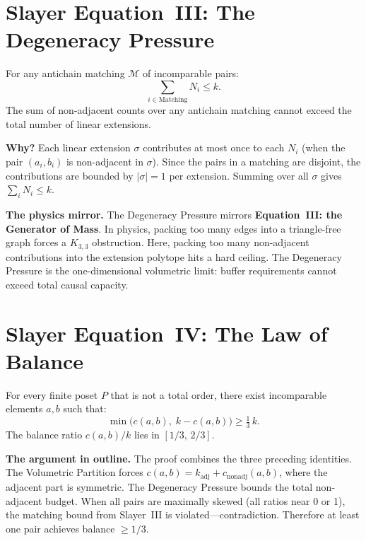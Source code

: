 \documentclass[11pt, a4paper, openany]{book}
\newcounter{thm}[chapter]
\begin{document}
\section{Slayer Equation~III: The Degeneracy Pressure}

\begin{theorem}\label{thm:degeneracy-pressure}
For any antichain matching $\mathcal{M}$ of incomparable pairs:
\begin{equation}\label{eq:degeneracy-pressure}
  \sum_{i \in \mathrm{Matching}} N_i \leq k.
\end{equation}
The sum of non-adjacent counts over any antichain matching cannot
exceed the total number of linear extensions.
\end{theorem}

\noindent
\textbf{Why?} Each linear extension $\sigma$ contributes at most once to
each $N_i$ (when the pair $(a_i, b_i)$ is non-adjacent in $\sigma$).
Since the pairs in a matching are disjoint, the contributions are
bounded by $|\sigma| = 1$ per extension. Summing over all $\sigma$ gives
$\sum_i N_i \leq k$.

\medskip\noindent
\textbf{The physics mirror.} The Degeneracy Pressure mirrors
\textbf{Equation~III: the Generator of Mass}. In physics, packing too
many edges into a triangle-free graph forces a $K_{3,3}$ obstruction.
Here, packing too many non-adjacent contributions into the extension
polytope hits a hard ceiling. The Degeneracy Pressure is the
one-dimensional volumetric limit: buffer requirements cannot exceed
total causal capacity.

\section{Slayer Equation~IV: The Law of Balance}

\begin{theorem}\label{thm:law-of-balance}
For every finite poset $P$ that is not a total order, there exist
incomparable elements $a, b$ such that:
\begin{equation}\label{eq:law-of-balance}
  \min\bigl(c(a,b),\; k - c(a,b)\bigr) \geq \tfrac{1}{3}\,k.
\end{equation}
The balance ratio $c(a,b)/k$ lies in $[1/3,\, 2/3]$.
\end{theorem}

\noindent
\textbf{The argument in outline.} The proof combines the three preceding
identities. The Volumetric Partition forces
$c(a,b) = k_{\mathrm{adj}} + c_{\mathrm{nonadj}}(a,b)$, where the
adjacent part is symmetric. The Degeneracy Pressure bounds the total
non-adjacent budget. When all pairs are maximally skewed (all ratios near
0 or 1), the matching bound from Slayer~III is violated---contradiction.
Therefore at least one pair achieves balance $\geq 1/3$.
\end{document}
